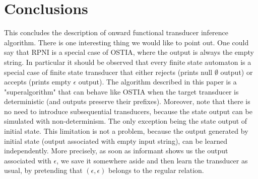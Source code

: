 \fi

\section{Conclusions}
This concludes the description of onward functional transducer inference algorithm. There is one interesting thing we would like to point out. One could say that RPNI is a special case of OSTIA, where the output is always the empty string. In particular it should be observed that every finite state automaton is a special case of finite state transducer that either rejects (prints null $\emptyset$ output) or accepts (prints empty $\epsilon$ output). The algorithm described in this paper is a "superalgorithm" that can behave like OSTIA when the target transducer is deterministic (and outputs preserve their prefixes). 
Moreover, note that there is no need to introduce subsequential transducers, because the state output can be simulated with non-determinism. The only exception being the state output of initial state. This limitation is not a problem, because the output generated by initial state (output associated with empty input string), can be learned independently. More precisely, as soon as informant shows us the output associated with $\epsilon$, we save it somewhere aside and then learn the transducer as usual, by pretending that $(\epsilon,\epsilon)$ belongs to the regular relation.
